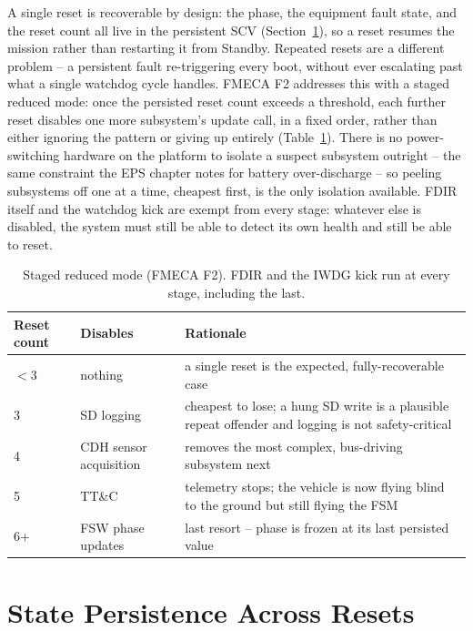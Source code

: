 A single reset is recoverable by design: the phase, the equipment fault
state, and the reset count all live in the persistent SCV
(Section~\ref{sec:fsw-persistence}), so a reset resumes the mission rather
than restarting it from Standby. Repeated resets are a different problem
-- a persistent fault re-triggering every boot, without ever escalating
past what a single watchdog cycle handles. FMECA F2 addresses this with a
staged reduced mode: once the persisted reset count exceeds a threshold,
each further reset disables one more subsystem's update call, in a fixed
order, rather than either ignoring the pattern or giving up entirely
(Table~\ref{tab:fsw-reduced-mode}). There is no power-switching hardware on
the platform to isolate a suspect subsystem outright -- the same
constraint the EPS chapter notes for battery over-discharge -- so peeling
subsystems off one at a time, cheapest first, is the only isolation
available. FDIR itself and the watchdog kick are exempt from every stage:
whatever else is disabled, the system must still be able to detect its own
health and still be able to reset.

\begin{table}[H]
\centering
\begin{tabular}{p{2.3cm}p{3.2cm}p{8.5cm}}
\toprule
\textbf{Reset count} & \textbf{Disables} & \textbf{Rationale} \\
\midrule
$<$3 & nothing & a single reset is the expected, fully-recoverable case \\
3 & SD logging & cheapest to lose; a hung SD write is a plausible repeat offender and logging is not safety-critical \\
4 & CDH sensor acquisition & removes the most complex, bus-driving subsystem next \\
5 & TT\&C & telemetry stops; the vehicle is now flying blind to the ground but still flying the FSM \\
6+ & FSW phase updates & last resort -- phase is frozen at its last persisted value \\
\bottomrule
\end{tabular}
\caption{Staged reduced mode (FMECA F2). FDIR and the IWDG kick run at
every stage, including the last.}
\label{tab:fsw-reduced-mode}
\end{table}

\section{State Persistence Across Resets}
\label{sec:fsw-persistence}

